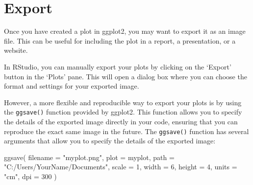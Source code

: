 \documentclass[
  letterpaper,
  DIV=11,
  numbers=noendperiod]{scrartcl}
\newenvironment{Shaded}{\begin{snugshade}}{\end{snugshade}}
\newcommand{\AttributeTok}[1]{\textcolor[rgb]{0.40,0.45,0.13}{#1}}
\newcommand{\DecValTok}[1]{\textcolor[rgb]{0.68,0.00,0.00}{#1}}
\newcommand{\FunctionTok}[1]{\textcolor[rgb]{0.28,0.35,0.67}{#1}}
\newcommand{\NormalTok}[1]{\textcolor[rgb]{0.00,0.23,0.31}{#1}}
\newcommand{\StringTok}[1]{\textcolor[rgb]{0.13,0.47,0.30}{#1}}
\begin{document}
\hypertarget{export}{%
\section{Export}\label{export}}

Once you have created a plot in ggplot2, you may want to export it as an
image file. This can be useful for including the plot in a report, a
presentation, or a website.

In RStudio, you can manually export your plots by clicking on the
`Export' button in the `Plots' pane. This will open a dialog box where
you can choose the format and settings for your exported image.

However, a more flexible and reproducible way to export your plots is by
using the \texttt{ggsave()} function provided by ggplot2. This function
allows you to specify the details of the exported image directly in your
code, ensuring that you can reproduce the exact same image in the
future. The \texttt{ggsave()} function has several arguments that allow
you to specify the details of the exported image:

\begin{Shaded}
\begin{Highlighting}[]
\FunctionTok{ggsave}\NormalTok{(}
  \AttributeTok{filename =} \StringTok{"myplot.png"}\NormalTok{, }
  \AttributeTok{plot =}\NormalTok{ myplot, }
  \AttributeTok{path =} \StringTok{"C:/Users/YourName/Documents"}\NormalTok{, }
  \AttributeTok{scale =} \DecValTok{1}\NormalTok{, }
  \AttributeTok{width =} \DecValTok{6}\NormalTok{, }
  \AttributeTok{height =} \DecValTok{4}\NormalTok{, }
  \AttributeTok{units =} \StringTok{"cm"}\NormalTok{, }
  \AttributeTok{dpi =} \DecValTok{300}
\NormalTok{)}
\end{Highlighting}
\end{Shaded}
\end{document}
